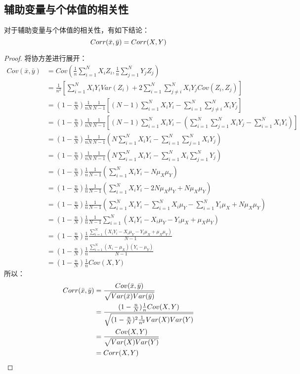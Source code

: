 \subsection{辅助变量与个体值的相关性}
\begin{theorem}
	对于辅助变量与个体值的相关性，有如下结论：
	\begin{equation}
		Corr(\bar{x},\bar{y})=Corr(X,Y)\notag
	\end{equation}
\end{theorem}
\begin{proof}
	将协方差进行展开：
	\begin{align*}
		Cov(\bar{x},\bar{y})
		&=Cov\left(\frac{1}{n}\sum_{i=1}^NX_iZ_i,\frac{1}{n}\sum_{j=1}^NY_jZ_j\right) \\
		&=\frac{1}{n^2}\left[\sum_{i=1}^NX_iY_iVar(Z_i)+2\sum_{i=1}^N\sum_{j\ne i}^NX_iY_jCov(Z_i,Z_j)\right] \\
		&=\left(1-\frac{n}{N}\right)\frac{1}{nN}\frac{1}{N-1}\left[(N-1)\sum_{i=1}^NX_iY_i-\sum_{i=1}^N\sum_{j\ne i}^NX_iY_j\right] \\
		&=\left(1-\frac{n}{N}\right)\frac{1}{nN}\frac{1}{N-1}\left[(N-1)\sum_{i=1}^NX_iY_i-\left(\sum_{i=1}^N\sum_{j=1}^NX_iY_j-\sum_{i=1}^NX_iY_i\right) \right] \\
		&=\left(1-\frac{n}{N}\right)\frac{1}{nN}\frac{1}{N-1}\left(N\sum_{i=1}^NX_iY_i-\sum_{i=1}^N\sum_{j=1}^NX_iY_j\right) \\
		&=\left(1-\frac{n}{N}\right)\frac{1}{nN}\frac{1}{N-1}\left(N\sum_{i=1}^NX_iY_i-\sum_{i=1}^NX_i\sum_{j=1}^NY_j\right) \\
		&=\left(1-\frac{n}{N}\right)\frac{1}{n}\frac{1}{N-1}\left(\sum_{i=1}^NX_iY_i-N\mu_X\mu_Y\right) \\
		&=\left(1-\frac{n}{N}\right)\frac{1}{n}\frac{1}{N-1}\left(\sum_{i=1}^NX_iY_i-2N\mu_X\mu_Y+N\mu_X\mu_Y\right) \\
		&=\left(1-\frac{n}{N}\right)\frac{1}{n}\frac{1}{N-1}\left(\sum_{i=1}^NX_iY_i-\sum_{i=1}^NX_i\mu_Y-\sum_{i=1}^NY_i\mu_X+N\mu_X\mu_Y\right) \\
		&=\left(1-\frac{n}{N}\right)\frac{1}{n}\frac{1}{N-1}\sum_{i=1}^N(X_iY_i-X_i\mu_Y-Y_i\mu_X+\mu_X\mu_Y) \\
		&=\left(1-\frac{n}{N}\right)\frac{1}{n}\frac{\sum_{i=1}^N(X_iY_i-X_i\mu_Y-Y_i\mu_X+\mu_X\mu_Y)}{N-1} \\
		&=\left(1-\frac{n}{N}\right)\frac{1}{n}\frac{\sum_{i=1}^N(X_i-\mu_X)(Y_i-\mu_Y)}{N-1} \\
		&=\left(1-\frac{n}{N}\right)\frac{1}{n}Cov(X,Y)
	\end{align*}
	所以：
	\begin{align*}
		Corr(\bar{x},\bar{y})&=\frac{Cov(\bar{x},\bar{y})}{\sqrt{Var(\bar{x})Var(\bar{y})}} \\
		&=\frac{(1-\frac{n}{N})\frac{1}{n}Cov(X,Y)}{\sqrt{(1-\frac{n}{N})^2\frac{1}{n^2}Var(X)Var(Y)}} \\
		&=\frac{Cov(X,Y)}{\sqrt{Var(X)Var(Y)}} \\
		&=Corr(X,Y) \qedhere
	\end{align*}
\end{proof}
